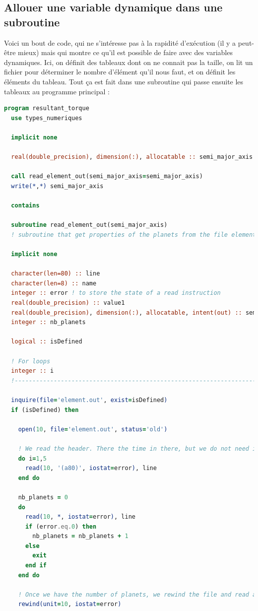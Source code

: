 \documentclass[a4paper,twoside]{article}
\begin{document}
\subsection{Allouer une variable dynamique dans une subroutine}
Voici un bout de code, qui ne s'intéresse pas à la rapidité d'exécution (il y a peut-être mieux) mais qui montre ce qu'il est possible de faire avec des variables dynamiques. Ici, on définit des tableaux dont on ne connait pas la taille, on lit un fichier pour déterminer le nombre d'élément qu'il nous faut, et on définit les éléments du tableau. Tout ça est fait dans une subroutine qui passe ensuite les tableaux au programme principal : 
\begin{lstlisting}[language=Fortran]
program resultant_torque
  use types_numeriques
    
  implicit none
  
  real(double_precision), dimension(:), allocatable :: semi_major_axis

  call read_element_out(semi_major_axis=semi_major_axis)
  write(*,*) semi_major_axis
  
  contains
  
  subroutine read_element_out(semi_major_axis)
  ! subroutine that get properties of the planets from the file element.out
  
  implicit none
  
  character(len=80) :: line
  character(len=8) :: name
  integer :: error ! to store the state of a read instruction
  real(double_precision) :: value1
  real(double_precision), dimension(:), allocatable, intent(out) :: semi_major_axis
  integer :: nb_planets
  
  logical :: isDefined
  
  ! For loops
  integer :: i
  !------------------------------------------------------------------------------
  
  inquire(file='element.out', exist=isDefined)
  if (isDefined) then
  
    open(10, file='element.out', status='old')
    
    ! We read the header. There the time in there, but we do not need it for the moment
    do i=1,5
      read(10, '(a80)', iostat=error), line
    end do
    
    nb_planets = 0
    do 
      read(10, *, iostat=error), line
      if (error.eq.0) then
        nb_planets = nb_planets + 1
      else
        exit
      end if
    end do

    ! Once we have the number of planets, we rewind the file and read again
    rewind(unit=10, iostat=error)
    

\end{lstlisting}
\end{document}

